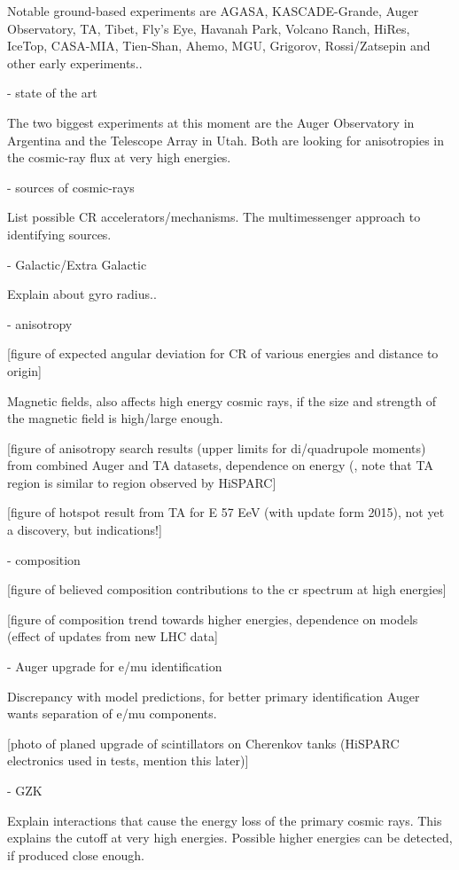 Notable ground-based experiments are AGASA, KASCADE-Grande, Auger Observatory, TA, Tibet, Fly's Eye, Havanah Park, Volcano Ranch, HiRes, IceTop, CASA-MIA, Tien-Shan, Ahemo, MGU, Grigorov, Rossi/Zatsepin and other early experiments..

- state of the art

The two biggest experiments at this moment are the Auger Observatory in Argentina and the Telescope Array in Utah. Both are looking for anisotropies in the cosmic-ray flux at very high energies.

- sources of cosmic-rays

List possible CR accelerators/mechanisms. The multimessenger approach to identifying sources.

- Galactic/Extra Galactic

Explain about gyro radius..

- anisotropy

[figure of expected angular deviation for CR of various energies and distance to origin]

Magnetic fields, also affects high energy cosmic rays, if the size and strength of the magnetic field is high/large enough.

[figure of anisotropy search results (upper limits for di/quadrupole moments) from combined Auger and TA datasets, dependence on energy (, note that TA region is similar to region observed by HiSPARC]
\cite{augerta2014anisotropy}

[figure of hotspot result from TA for E 57 EeV (with update form 2015), not yet a discovery, but indications!]
\cite{ta2014hotspot}

- composition

[figure of believed composition contributions to the cr spectrum at high energies]

[figure of composition trend towards higher energies, dependence on models (effect of updates from new LHC data]

- Auger upgrade for e/mu identification

Discrepancy with model predictions, for better primary identification Auger wants separation of e/mu components.

[photo of planed upgrade of scintillators on Cherenkov tanks (HiSPARC electronics used in tests, mention this later)]

- GZK

Explain interactions that cause the energy loss of the primary cosmic rays.
This explains the cutoff at very high energies. Possible higher energies can be detected, if produced close enough.

